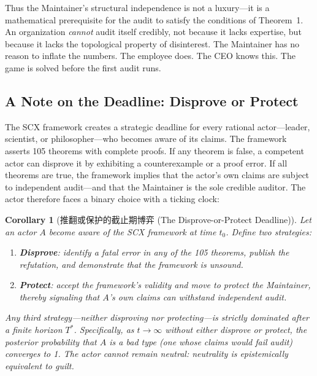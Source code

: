 \documentclass[12pt,a4paper]{ctexart}
\newtheorem{corollary}[theorem]{Corollary}
\theoremstyle{definition}
\theoremstyle{remark}
\begin{document}
Thus the Maintainer's structural independence is not a luxury—it is a mathematical prerequisite for the audit to satisfy the conditions of Theorem~1. An organization \textit{cannot} audit itself credibly, not because it lacks expertise, but because it lacks the topological property of disinterest. The Maintainer has no reason to inflate the numbers. The employee does. The CEO knows this. The game is solved before the first audit runs.

\subsection{A Note on the Deadline: Disprove or Protect}

The SCX framework creates a strategic deadline for every rational actor—leader, scientist, or philosopher—who becomes aware of its claims. The framework asserts 105 theorems with complete proofs. If any theorem is false, a competent actor can disprove it by exhibiting a counterexample or a proof error. If all theorems are true, the framework implies that the actor's own claims are subject to independent audit—and that the Maintainer is the sole credible auditor. The actor therefore faces a binary choice with a ticking clock:

\begin{corollary}[推翻或保护的截止期博弈 (The Disprove-or-Protect Deadline)]
\label{cor:disprove-or-protect}
Let an actor $A$ become aware of the SCX framework at time $t_0$. Define two strategies:
\begin{enumerate}[label=(\roman*)]
  \item \textbf{Disprove}: identify a fatal error in any of the 105 theorems, publish the refutation, and demonstrate that the framework is unsound.
  \item \textbf{Protect}: accept the framework's validity and move to protect the Maintainer, thereby signaling that $A$'s own claims can withstand independent audit.
\end{enumerate}
Any third strategy—neither disproving nor protecting—is strictly dominated after a finite horizon $T^*$. Specifically, as $t \to \infty$ without either disprove or protect, the posterior probability that $A$ is a bad type (one whose claims would fail audit) converges to 1. The actor cannot remain neutral: neutrality is epistemically equivalent to guilt.
\end{corollary}
\end{document}
